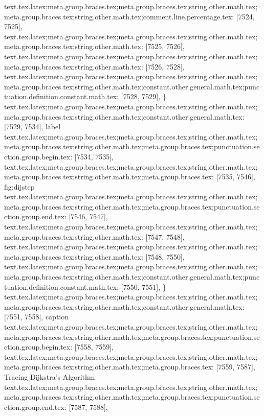 {{{{{{{{{{{{{{{{{{{{{{{{{{{{{{{{{{{{{{{{{{{{{{{{{{{{{{{{{{{{{{{{{{{{{{{{{{{{{{{{{{{{{{{{{{{{{{{{{{{{{{{{{{{{{{{{{{{{{{{{{{{{{{{{{{{{{{{{{{{{{{{{{{{{{{{{{{{{{{{{{{{{{{{{{{{{{{{{{{{{{{{{{{{{{{{{{{{{{{{{{{{{{text.tex.latex;meta.group.braces.tex;meta.group.braces.tex;string.other.math.tex;meta.group.braces.tex;string.other.math.tex;comment.line.percentage.tex: [7524, 7525], {%
text.tex.latex;meta.group.braces.tex;meta.group.braces.tex;string.other.math.tex;meta.group.braces.tex;string.other.math.tex: [7525, 7526], {
}
text.tex.latex;meta.group.braces.tex;meta.group.braces.tex;string.other.math.tex;meta.group.braces.tex;string.other.math.tex: [7526, 7528], {  }
text.tex.latex;meta.group.braces.tex;meta.group.braces.tex;string.other.math.tex;meta.group.braces.tex;string.other.math.tex;constant.other.general.math.tex;punctuation.definition.constant.math.tex: [7528, 7529], {\}
text.tex.latex;meta.group.braces.tex;meta.group.braces.tex;string.other.math.tex;meta.group.braces.tex;string.other.math.tex;constant.other.general.math.tex: [7529, 7534], {label}
text.tex.latex;meta.group.braces.tex;meta.group.braces.tex;string.other.math.tex;meta.group.braces.tex;string.other.math.tex;meta.group.braces.tex;punctuation.section.group.begin.tex: [7534, 7535], {{}
text.tex.latex;meta.group.braces.tex;meta.group.braces.tex;string.other.math.tex;meta.group.braces.tex;string.other.math.tex;meta.group.braces.tex: [7535, 7546], {fig:dijstep}
text.tex.latex;meta.group.braces.tex;meta.group.braces.tex;string.other.math.tex;meta.group.braces.tex;string.other.math.tex;meta.group.braces.tex;punctuation.section.group.end.tex: [7546, 7547], {}}
text.tex.latex;meta.group.braces.tex;meta.group.braces.tex;string.other.math.tex;meta.group.braces.tex;string.other.math.tex: [7547, 7548], {
}
text.tex.latex;meta.group.braces.tex;meta.group.braces.tex;string.other.math.tex;meta.group.braces.tex;string.other.math.tex: [7548, 7550], {  }
text.tex.latex;meta.group.braces.tex;meta.group.braces.tex;string.other.math.tex;meta.group.braces.tex;string.other.math.tex;constant.other.general.math.tex;punctuation.definition.constant.math.tex: [7550, 7551], {\}
text.tex.latex;meta.group.braces.tex;meta.group.braces.tex;string.other.math.tex;meta.group.braces.tex;string.other.math.tex;constant.other.general.math.tex: [7551, 7558], {caption}
text.tex.latex;meta.group.braces.tex;meta.group.braces.tex;string.other.math.tex;meta.group.braces.tex;string.other.math.tex;meta.group.braces.tex;punctuation.section.group.begin.tex: [7558, 7559], {{}
text.tex.latex;meta.group.braces.tex;meta.group.braces.tex;string.other.math.tex;meta.group.braces.tex;string.other.math.tex;meta.group.braces.tex: [7559, 7587], {Tracing Dijkstra's Algorithm}
text.tex.latex;meta.group.braces.tex;meta.group.braces.tex;string.other.math.tex;meta.group.braces.tex;string.other.math.tex;meta.group.braces.tex;punctuation.section.group.end.tex: [7587, 7588], {}}
}}}}}}}}}}}}}}}}}}}}}}}}}}}}}}}}}}}}}}}}}}}}}}}}}}}}}}}}}}}}}}}}}}}}}}}}}}}}}}}}}}}}}}}}}}}}}}}}}}}}}}}}}}}}}}}}}}}}}}}}}}}}}}}}}}}}}}}}}}}}}}}}}}}}}}}}}}}}}}}}}}}}}}}}}}}}}}}}}}}}}}}}}}}}}}}}}}}}}}}}}}}}}}}}
